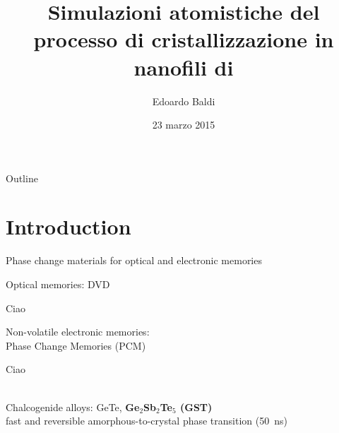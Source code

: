 \documentclass{beamer}
\title[Cristallizzazione in nanofili di \gete] %
{Simulazioni atomistiche del processo di cristallizzazione in nanofili di \gete}
\author[Edoardo Baldi] %
{Edoardo Baldi \\\medskip {\small\emph{Relatore:} Prof.~Marco~Bernasconi}}
\date[] %
{23 marzo 2015}
\begin{document}
\begin{frame}
  \titlepage
\end{frame}

\begin{frame}{Outline}
  \tableofcontents
\end{frame}


\section{Introduction}

\begin{frame}{Phase change materials for optical and electronic memories}
\begin{minipage}{1.0\textwidth}
  \begin{minipage}[b]{0.53\linewidth}
  Optical memories: DVD
  \end{minipage}
\hfill
  \begin{minipage}[b]{0.43\linewidth}\centering
  Ciao
  \end{minipage}
\end{minipage}
\begin{minipage}{1.0\textwidth}
  \begin{minipage}[b]{0.53\linewidth}
  Non-volatile electronic memories:\hfill\\ Phase Change Memories (PCM)
  \end{minipage}
\hfill
  \begin{minipage}[b]{0.43\linewidth}\centering
  Ciao
  \end{minipage}
\end{minipage}
\vspace{1cm}\\
Chalcogenide alloys: {\ev GeTe}, \textcolor{themecolor}{\textbf{Ge$_2$Sb$_2$Te$_5$ (GST)}}\\
\vspace{0.5cm}
fast and reversible amorphous-to-crystal phase transition (50~ns)\\
\end{frame}
\end{document}
